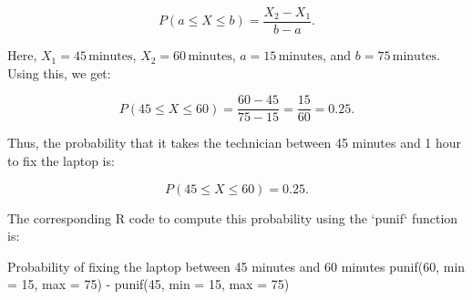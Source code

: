 \documentclass{article} %
\begin{document}
\[
P(a \leq X \leq b) = \frac{X_2 - X_1}{b - a}.
\]

Here, \( X_1 = 45 \, \text{minutes} \), \( X_2 = 60 \, \text{minutes} \), \( a = 15 \, \text{minutes} \), and \( b = 75 \, \text{minutes} \). Using this, we get:

\[
P(45 \leq X \leq 60) = \frac{60 - 45}{75 - 15} = \frac{15}{60} = 0.25.
\]

Thus, the probability that it takes the technician between 45 minutes and 1 hour to fix the laptop is:

\[
P(45 \leq X \leq 60) = 0.25.
\]

The corresponding R code to compute this probability using the `punif` function is:

Probability of fixing the laptop between 45 minutes and 60 minutes
punif(60, min = 15, max = 75) - punif(45, min = 15, max = 75)
\end{document}
